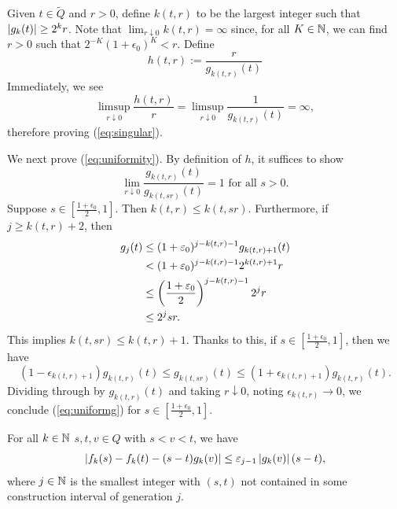 Given $t \in \widetilde{Q}$ and $r > 0$, define $k(t,r)$ to be the largest integer such that $\left\vert {g_k(t)} \right\vert \geq 2^k r$. Note that $\lim_{r \downarrow 0} k(t,r) = \infty$ since, for all $K \in \mathbb{N}$, we can find $r > 0$ such that $2^{-K}(1+\epsilon_0)^K < r$. Define 
\begin{equation}
    h(t,r) := \frac{r}{g_{k(t,r)}(t)}
\end{equation}
Immediately, we see 
\begin{equation}
    \limsup_{r \downarrow 0} \frac{h(t,r)}{r} = \limsup_{r \downarrow 0} \frac{1}{g_{k(t,r)}(t)} = \infty,
\end{equation}
therefore proving (\ref{eq:singular}).

We next prove (\ref{eq:uniformity}). By definition of $h$, it suffices to show 
\begin{equation} \label{eq:uniformg}
    \lim_{r \downarrow 0} \frac{g_{k(t,r)}(t)}{g_{k(t,sr)}(t)} = 1 \text{ for all } s > 0.
\end{equation}
Suppose $s \in [\frac{1+\epsilon_0}{2},1]$. Then $k(t,r) \leq k(t,sr)$. Furthermore, if $j \geq k(t,r) + 2$, then 
\begin{equation} \begin{aligned}
    g_j(t) &\leq (1+\varepsilon_0)^{j-k(t,r)-1}g_{k(t,r)+1}(t) \\
           &< (1 + \varepsilon_0)^{j-k(t,r)-1}2^{k(t,r)+1}r \\
           &\leq \left( {\frac{1+\varepsilon_0}{2}} \right)^{j-k(t,r)-1} 2^j r \\
           &\leq 2^j sr. 
\end{aligned} \end{equation}
This implies $k(t,sr) \leq k(t,r) + 1$. Thanks to this, if $s \in [\frac{1+\epsilon_0}{2},1]$, then we have 
\begin{equation}
    (1-\epsilon_{k(t,r)+1}) g_{k(t,r)}(t) \leq g_{k(t,sr)}(t) \leq (1+\epsilon_{k(t,r)+1}) g_{k(t,r)}(t).
\end{equation}
Dividing through by $g_{k(t,r)}(t)$ and taking $r \downarrow 0$, noting $\epsilon_{k(t,r)} \to 0$, we conclude (\ref{eq:uniformg}) for $s \in [\frac{1+\epsilon_0}{2},1]$.

For all $k \in \mathbb{N}$ $s,t,v \in Q$ with $s < v < t$, we have 
\begin{equation}
    \left\vert {f_k(s) - f_k(t) - (s-t)g_k(v)} \right\vert \leq \varepsilon_{j-1} \left\vert {g_k(v)} \right\vert(s-t),
\end{equation}
where $j \in \mathbb{N}$ is the smallest integer with $(s,t)$ not contained in some construction interval of generation $j$.





